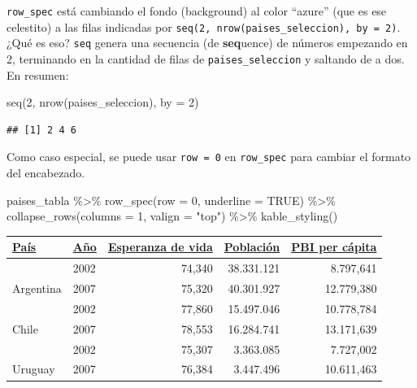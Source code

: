 \documentclass[
  openany]{book}
\newenvironment{Shaded}{\begin{snugshade}}{\end{snugshade}}
\newcommand{\AttributeTok}[1]{\textcolor[rgb]{0.77,0.63,0.00}{#1}}
\newcommand{\ConstantTok}[1]{\textcolor[rgb]{0.00,0.00,0.00}{#1}}
\newcommand{\DecValTok}[1]{\textcolor[rgb]{0.00,0.00,0.81}{#1}}
\newcommand{\FunctionTok}[1]{\textcolor[rgb]{0.00,0.00,0.00}{#1}}
\newcommand{\NormalTok}[1]{#1}
\newcommand{\SpecialCharTok}[1]{\textcolor[rgb]{0.00,0.00,0.00}{#1}}
\newcommand{\StringTok}[1]{\textcolor[rgb]{0.31,0.60,0.02}{#1}}
\begin{document}
\texttt{row\_spec} está cambiando el fondo (background) al color ``azure'' (que es ese celestito) a las filas indicadas por \texttt{seq(2,\ nrow(paises\_seleccion),\ by\ =\ 2)}.
¿Qué es eso?
\texttt{seq} genera una secuencia (de \textbf{seq}uence) de números empezando en 2, terminando en la cantidad de filas de \texttt{paises\_seleccion} y saltando de a dos.
En resumen:

\begin{Shaded}
\begin{Highlighting}[]
\FunctionTok{seq}\NormalTok{(}\DecValTok{2}\NormalTok{, }\FunctionTok{nrow}\NormalTok{(paises\_seleccion), }\AttributeTok{by =} \DecValTok{2}\NormalTok{)}
\end{Highlighting}
\end{Shaded}

\begin{verbatim}
## [1] 2 4 6
\end{verbatim}

Como caso especial, se puede usar \texttt{row\ =\ 0} en \texttt{row\_spec} para cambiar el formato del encabezado.

\begin{Shaded}
\begin{Highlighting}[]
\NormalTok{paises\_tabla }\SpecialCharTok{\%\textgreater{}\%} 
  \FunctionTok{row\_spec}\NormalTok{(}\AttributeTok{row =} \DecValTok{0}\NormalTok{, }\AttributeTok{underline =} \ConstantTok{TRUE}\NormalTok{) }\SpecialCharTok{\%\textgreater{}\%} 
  \FunctionTok{collapse\_rows}\NormalTok{(}\AttributeTok{columns =} \DecValTok{1}\NormalTok{, }\AttributeTok{valign =} \StringTok{"top"}\NormalTok{)  }\SpecialCharTok{\%\textgreater{}\%}
  \FunctionTok{kable\_styling}\NormalTok{() }
\end{Highlighting}
\end{Shaded}

\begin{table}
\centering
\begin{tabular}{l|l|r|r|r}
\hline
\underline{País} & \underline{Año} & \underline{Esperanza de vida} & \underline{Población} & \underline{PBI per cápita}\\
\hline
 & 2002 & 74,340 & 38.331.121 & 8.797,641\\
\cline{2-5}
\multirow[t]{-2}{*}{\raggedright\arraybackslash Argentina} & 2007 & 75,320 & 40.301.927 & 12.779,380\\
\cline{1-5}
 & 2002 & 77,860 & 15.497.046 & 10.778,784\\
\cline{2-5}
\multirow[t]{-2}{*}{\raggedright\arraybackslash Chile} & 2007 & 78,553 & 16.284.741 & 13.171,639\\
\cline{1-5}
 & 2002 & 75,307 & 3.363.085 & 7.727,002\\
\cline{2-5}
\multirow[t]{-2}{*}{\raggedright\arraybackslash Uruguay} & 2007 & 76,384 & 3.447.496 & 10.611,463\\
\hline
\end{tabular}
\end{table}
\end{document}
